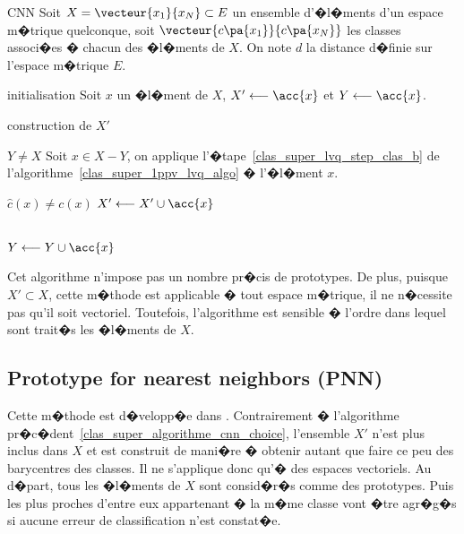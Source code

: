         
        \begin{xalgorithm}{CNN}\label{clas_super_algorithme_cnn_choice}
        Soit $X = \vecteur{x_1}{x_N} \subset E$ un ensemble d'�l�ments d'un espace m�trique quelconque, 
        soit $\vecteur{c\pa{x_1}}{c\pa{x_N}}$ les classes associ�es � chacun des �l�ments de $X$. On note 
        $d$ la distance d�finie sur l'espace m�trique $E$. 
        
        \begin{xalgostep}{initialisation}
        Soit $x$ un �l�ment de $X$,     $X' \longleftarrow \acc{ x}$ et $Y \longleftarrow \acc{x}$.
        \end{xalgostep}
        
        \begin{xalgostep}{construction de $X'$}\label{clas_super_cnn_step_b}
        \begin{xwhile}{$Y \neq X$}
        Soit $x \in X - Y$, on applique l'�tape~\ref{clas_super_lvq_step_clas_b} de 
        l'algorithme~\ref{clas_super_1ppv_lvq_algo} � l'�l�ment $x$.\\
            \begin{xif}{$\hat{c}(x) \neq c(x)$}
            $X' \longleftarrow X' \cup \acc{x}$
            \end{xif}\\
            $Y \longleftarrow Y \cup \acc{x}$
        \end{xwhile}
        \end{xalgostep}
        
        \end{xalgorithm}


Cet algorithme n'impose pas un nombre pr�cis de prototypes. De plus, puisque $X' \subset X$, cette m�thode est applicable � tout espace m�trique, il ne n�cessite pas qu'il soit vectoriel. Toutefois, l'algorithme est sensible � l'ordre dans lequel sont trait�s les �l�ments de $X$.



\subsection{Prototype for nearest neighbors (PNN)}
\label{clas_super_lvq_pnn}

Cette m�thode est d�velopp�e dans . Contrairement � l'algorithme pr�c�dent~\ref{clas_super_algorithme_cnn_choice}, l'ensemble $X'$ n'est plus inclus dans $X$ et est construit de mani�re � obtenir autant que faire ce peu des barycentres des classes. Il ne s'applique donc qu'� des espaces vectoriels. Au d�part, tous les �l�ments de $X$ sont consid�r�s comme des prototypes. Puis les plus proches d'entre eux appartenant � la m�me classe vont �tre agr�g�s si aucune erreur de classification n'est constat�e.



